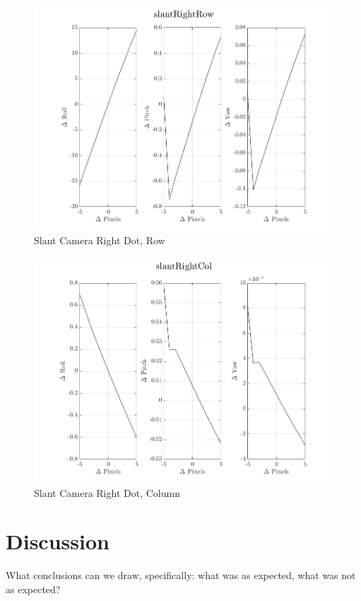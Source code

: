 \documentclass[12pt]{article}
\begin{document}
\begin{multicols}{2}
\begin{figure}[H]
	\includegraphics[width=0.9\columnwidth]{slantRightRow.png}
	\caption{Slant Camera Right Dot, Row\label{fig:slantRightRow}}
\end{figure}

\begin{figure}[H]
	\includegraphics[width=0.9\columnwidth]{slantRightCol.png}
	\caption{Slant Camera Right Dot, Column\label{fig:slantRightCol}}
\end{figure}

\section{Discussion}

What conclusions can we draw, specifically: what was as expected, what was not as expected?

\end{multicols}
\end{document}

